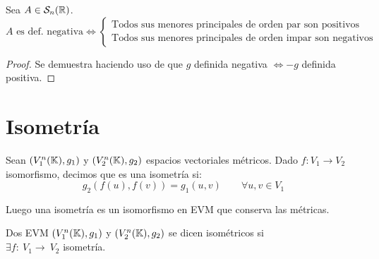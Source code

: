 \begin{coro}
    Sea $A\in\mathcal{S}_n(\mathbb{R})$.
    $$A\text{ es def. negativa} \Longleftrightarrow \left\{ \begin{array}{c}
        \text{Todos sus menores principales de orden par son positivos} \\
        \text{Todos sus menores principales de orden impar son negativos}
    \end{array}\right.$$
\end{coro}
\begin{proof}
    Se demuestra haciendo uso de que $g$ definida negativa $\Longleftrightarrow -g$ definida positiva.
\end{proof}

\section{Isometría}
\begin{definicion} [Isometría]
    Sean $(V_1^n(\mathbb{K}), g_1)$ y $(V_2^n(\mathbb{K}), g_2)$ espacios vectoriales métricos. Dado $f:V_1\to V_2$ isomorfismo, decimos que es una isometría si:
    \begin{equation*}
        g_2(f(u),f(v)) = g_1(u,v) \qquad \forall u,v \in V_1
    \end{equation*}

    Luego una isometría es un isomorfismo en EVM que conserva las métricas.
\end{definicion}

\begin{definicion}
    Dos EVM $(V_1^n(\mathbb{K}), g_1)$ y $(V_2^n(\mathbb{K}), g_2)$ se dicen isométricos si \\ $\exists f:~V_1\to~V_2$ isometría.
\end{definicion}

